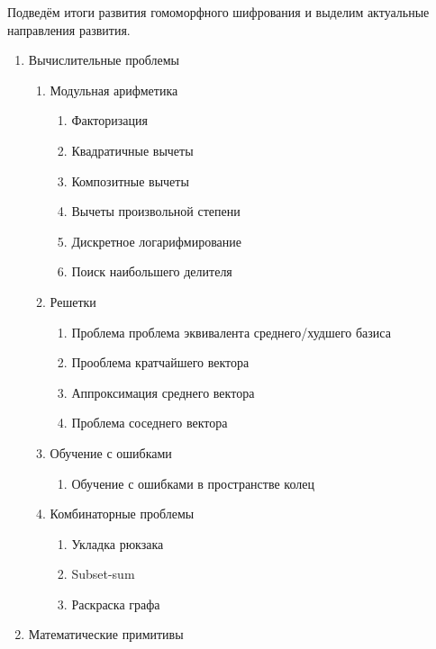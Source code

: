     Подведём итоги развития гомоморфного шифрования и выделим актуальные направления развития.
    \begin{enumerate}
        \item Вычислительные проблемы
		\begin{enumerate}
			\item Модульная арифметика
		            \begin{enumerate}
                              \item Факторизация
                              \item Квадратичные вычеты
                              \item Композитные вычеты
                              \item Вычеты произвольной степени
                              \item Дискретное логарифмирование
                              \item Поиск наибольшего делителя
                        \end{enumerate}
			\item Решетки
		            \begin{enumerate}
			            \item Проблема проблема эквивалента среднего/худшего базиса
			            \item Прооблема кратчайшего вектора
			            \item Аппроксимация среднего вектора
                              \item Проблема соседнего вектора
                        \end{enumerate}
			\item Обучение с ошибками
		            \begin{enumerate}
			            \item Обучение с ошибками в пространстве колец
                        \end{enumerate}
			\item Комбинаторные проблемы
		            \begin{enumerate}
                              \item Укладка рюкзака
			            \item Subset-sum
                              \item Раскраска графа
                        \end{enumerate}
		\end{enumerate}
	\item Математические примитивы

\end{enumerate}
